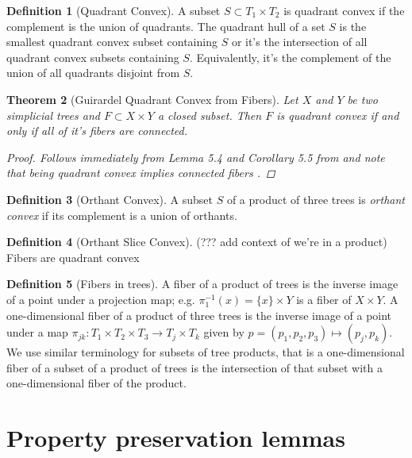 \documentclass[12pt,parskip=full]{report}
\theoremstyle{plain}
\newtheorem{thm}{Theorem}[section]
\theoremstyle{definition}
\newtheorem{dfn}[thm]{Definition}
\begin{document}
\begin{dfn}
    [Quadrant Convex]
    A subset \(S \subset T_1\times T_2\) is quadrant convex if the complement is the union of quadrants. The quadrant hull of a set \(S\) is the smallest quadrant convex subset containing \(S\) or it's the intersection of all quadrant convex subsets containing \(S\). Equivalently, it's the complement of the union of all quadrants disjoint from \(S\). 
\end{dfn}

\begin{thm}
    [Guirardel Quadrant Convex from Fibers]
    \label{thm:guirardelsliceconvex}
    Let \(X\) and \(Y\) be two simplicial trees and \(F\subset X\times Y\) a closed subset. Then \(F\) is quadrant convex if and only if all of it's fibers are connected.
    \begin{proof}
        Follows immediately from Lemma 5.4 and Corollary 5.5 from \cite{guirardelcorepaper} and note that being quadrant convex implies connected fibers \cite{guirardelcorepaper}.
    \end{proof}
\end{thm}

\begin{dfn}
    [Orthant Convex]
    A subset \(S\) of a product of three trees is \emph{orthant convex} if its complement is a union of orthants.
\end{dfn}

\begin{dfn}
    [Orthant Slice Convex]
    (??? add context of we're in a product) Fibers are quadrant convex
\end{dfn}

\begin{dfn}
    [Fibers in trees]
    \label{dfn:treefibers}
    A fiber of a product of trees is the inverse image of a point under a projection map; e.g. \( \pi_1^{-1}(x) = \{x\} \times Y\) is a fiber of \(X\times Y\). A one-dimensional fiber of a product of three trees is the inverse image of a point under a map \(\pi_{jk}: T_1\times T_2\times T_3 \to T_j\times T_k\) given by \(p = (p_1,p_2,p_3) \mapsto (p_j, p_k)\). We use similar terminology for subsets of tree products, that is a one-dimensional fiber of a subset of a product of trees is the intersection of that subset with a one-dimensional fiber of the product.
    
\end{dfn}

\section{Property preservation lemmas}
\end{document}
